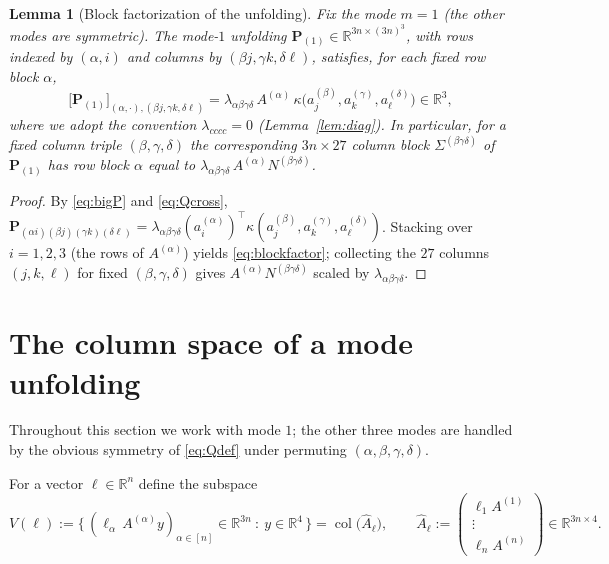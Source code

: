 \documentclass[12pt]{article}
\DeclareMathOperator{\col}{col}
\newcommand{\bR}{\mathbb{R}}
\newtheorem{lemma}{Lemma}
\theoremstyle{definition}
\begin{document}
\begin{lemma}[Block factorization of the unfolding]\label{lem:factor}
Fix the mode $m=1$ (the other modes are symmetric).  The mode-$1$ unfolding
$\mathbf P_{(1)}\in\bR^{3n\times(3n)^3}$, with rows indexed by $(\alpha,i)$ and
columns by $(\beta j,\gamma k,\delta\ell)$, satisfies, for each fixed row block
$\alpha$,
\begin{equation}\label{eq:blockfactor}
\bigl[\mathbf P_{(1)}\bigr]_{(\alpha,\cdot),(\beta j,\gamma k,\delta\ell)}
=\lambda_{\alpha\beta\gamma\delta}\,
A^{(\alpha)}\,\kappa\bigl(a^{(\beta)}_j,a^{(\gamma)}_k,a^{(\delta)}_\ell\bigr)
\in\bR^3 ,
\end{equation}
where we adopt the convention $\lambda_{cccc}=0$ (Lemma~\ref{lem:diag}).  In
particular, for a fixed column triple $(\beta,\gamma,\delta)$ the corresponding
$3n\times27$ column block $\Sigma^{(\beta\gamma\delta)}$ of $\mathbf P_{(1)}$ has
row block $\alpha$ equal to
$\lambda_{\alpha\beta\gamma\delta}\,A^{(\alpha)}N^{(\beta\gamma\delta)}$.
\end{lemma}

\begin{proof}
By \eqref{eq:bigP} and \eqref{eq:Qcross},
$\mathbf P_{(\alpha i)(\beta j)(\gamma k)(\delta\ell)}
=\lambda_{\alpha\beta\gamma\delta}(a^{(\alpha)}_i)^\top
\kappa(a^{(\beta)}_j,a^{(\gamma)}_k,a^{(\delta)}_\ell)$.
Stacking over $i=1,2,3$ (the rows of $A^{(\alpha)}$) yields
\eqref{eq:blockfactor}; collecting the $27$ columns $(j,k,\ell)$ for fixed
$(\beta,\gamma,\delta)$ gives $A^{(\alpha)}N^{(\beta\gamma\delta)}$ scaled by
$\lambda_{\alpha\beta\gamma\delta}$.
\end{proof}

\section{The column space of a mode unfolding}

Throughout this section we work with mode $1$; the other three modes are handled by
the obvious symmetry of \eqref{eq:Qdef} under permuting $(\alpha,\beta,\gamma,\delta)$.

For a vector $\ell\in\bR^n$ define the subspace
\begin{equation}\label{eq:Vell}
V(\ell):=\bigl\{\,(\ell_\alpha\,A^{(\alpha)}y)_{\alpha\in[n]}\in\bR^{3n}\ :\ y\in\bR^4\,\bigr\}
=\col\bigl(\widehat A_\ell\bigr),\qquad
\widehat A_\ell:=\begin{pmatrix}\ell_1A^{(1)}\\ \vdots\\ \ell_nA^{(n)}\end{pmatrix}\in\bR^{3n\times4}.
\end{equation}
\end{document}
